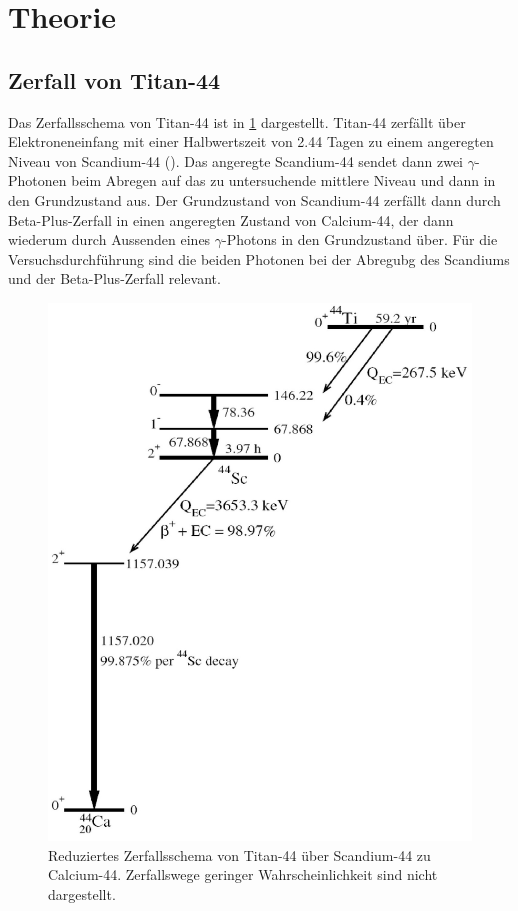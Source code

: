 \documentclass[
	a4paper,
	12pt,
	pagesize,
	ngerman
]{scrartcl}
\begin{document}
  \section{Theorie}
	\subsection{Zerfall von Titan-44}

	Das Zerfallsschema von Titan-44 ist in \cref{fig_Zerfallsschema} dargestellt. Titan-44 zerfällt über Elektroneneinfang mit einer Halbwertszeit von \SI{2,44}{} Tagen zu einem angeregten Niveau von Scandium-44 (\cite{Anleitung}).
	Das angeregte Scandium-44 sendet dann zwei $\gamma$-Photonen beim Abregen auf das zu untersuchende mittlere Niveau und dann in den Grundzustand aus.
	Der Grundzustand von Scandium-44 zerfällt dann durch Beta-Plus-Zerfall in einen angeregten Zustand von Calcium-44, der dann wiederum durch Aussenden eines $\gamma$-Photons in den Grundzustand über.
	Für die Versuchsdurchführung sind die beiden Photonen bei der Abregubg des Scandiums und der Beta-Plus-Zerfall relevant.

	\begin{figure}[H]
			\includegraphics[width=0.6\linewidth]{img/44Ti-decay_reduziert}
			\caption{
			Reduziertes Zerfallsschema von Titan-44 über Scandium-44 zu Calcium-44. Zerfallswege geringer Wahrscheinlichkeit sind nicht dargestellt.
			\cite{Zerfallsschema} %
			}
			\label{fig_Zerfallsschema}
	\end{figure}
\end{document}
